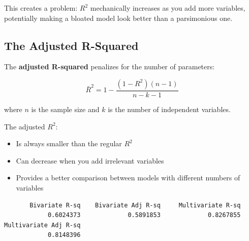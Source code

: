 \documentclass[
  letterpaper,
  DIV=11,
  numbers=noendperiod]{scrreprt}
\newenvironment{Shaded}{\begin{snugshade}}{\end{snugshade}}
\newcommand{\CommentTok}[1]{\textcolor[rgb]{0.37,0.37,0.37}{#1}}
\newcommand{\FunctionTok}[1]{\textcolor[rgb]{0.28,0.35,0.67}{#1}}
\newcommand{\NormalTok}[1]{\textcolor[rgb]{0.00,0.23,0.31}{#1}}
\newcommand{\OtherTok}[1]{\textcolor[rgb]{0.00,0.23,0.31}{#1}}
\newcommand{\SpecialCharTok}[1]{\textcolor[rgb]{0.37,0.37,0.37}{#1}}
\newcommand{\StringTok}[1]{\textcolor[rgb]{0.13,0.47,0.30}{#1}}
\providecommand{\tightlist}{%
  \setlength{\itemsep}{0pt}\setlength{\parskip}{0pt}}
\begin{document}
This creates a problem: \(R^2\) mechanically increases as you add more
variables, potentially making a bloated model look better than a
parsimonious one.

\subsection{The Adjusted R-Squared}\label{the-adjusted-r-squared}

The \textbf{adjusted R-squared} penalizes for the number of parameters:

\[
\bar{R}^2 = 1 - \frac{(1 - R^2)(n - 1)}{n - k - 1}
\]

where \(n\) is the sample size and \(k\) is the number of independent
variables.

The adjusted \(R^2\):

\begin{itemize}
\tightlist
\item
  Is always smaller than the regular \(R^2\)
\item
  Can decrease when you add irrelevant variables
\item
  Provides a better comparison between models with different numbers of
  variables
\end{itemize}

\begin{Shaded}
\end{Shaded}

\begin{verbatim}
       Bivariate R-sq    Bivariate Adj R-sq     Multivariate R-sq 
            0.6024373             0.5891853             0.8267855 
Multivariate Adj R-sq 
            0.8148396 
\end{verbatim}
\end{document}
